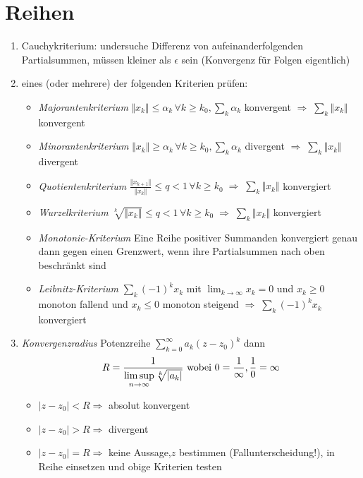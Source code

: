 \documentclass[ngerman,a4paper]{article}
\begin{document}
\section{Reihen}
\begin{enumerate}[label=\textbf{\arabic*.}]
	\item Cauchykriterium: undersuche Differenz von aufeinanderfolgenden Partialsummen, müssen kleiner als $\epsilon$ sein (Konvergenz für Folgen eigentlich)
	\item eines (oder mehrere) der folgenden Kriterien prüfen:
	\begin{itemize}
		\item \emph{Majorantenkriterium} $\Vert x_k\Vert \le \alpha_k\,\forall k\ge k_0,\sum_k \alpha_k$ konvergent $\Rightarrow\;\sum_k \Vert x_k\Vert$ konvergent
		\item \emph{Minorantenkriterium} $\Vert x_k\Vert\ge \alpha_k\,\forall k\ge k_0,\sum_k \alpha_k$ divergent $\Rightarrow\;\sum_k \Vert x_k\Vert$ divergent
		\item \emph{Quotientenkriterium} $\frac{\Vert x_{k+1}\Vert}{\Vert x_k\Vert} \le q < 1\,\forall k\ge k_0 \;\Rightarrow\;\sum_k \Vert x_k\Vert$ konvergiert
		\item \emph{Wurzelkriterium} $\sqrt[k]{\Vert x_k\Vert}\le q < 1\,\forall k\ge k_0\;\Rightarrow\;\sum_k\Vert x_k\Vert$ konvergiert
		\item\emph{Monotonie-Kriterium} Eine Reihe positiver Summanden konvergiert genau dann gegen einen Grenzwert, wenn ihre Partialsummen nach oben beschränkt sind
		\item \emph{Leibnitz-Kriterium} $\sum_k (-1)^kx_k$ mit $\lim_{k\to\infty}x_k=0$ und $x_k\ge 0$ monoton fallend und $x_k\le 0$ monoton steigend $\Rightarrow\;\sum_k (-1)^kx_k$ konvergiert 
	\end{itemize}
	\item \emph{Konvergenzradius} Potenzreihe $\sum_{k=0}^\infty a_k(z-z_0)^k$ dann
	\begin{align}
		R = \frac{1}{\limsup\limits_{n\rightarrow\infty}\sqrt[k]{|a_k|}}\text{ wobei }0 = \frac{1}{\infty}, \frac{1}{0} = \infty \notag
	\end{align}
	\begin{itemize}
		\item $\vert z-z_0\vert < R\Rightarrow$ absolut konvergent
		\item $\vert z-z_0\vert > R\Rightarrow$ divergent
		\item $\vert z-z_0\vert = R\Rightarrow$ keine Aussage,$z$ bestimmen (Fallunterscheidung!), in Reihe einsetzen und obige Kriterien testen
	\end{itemize}
\end{enumerate}
\end{document}
